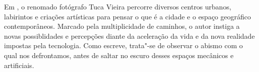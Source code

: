 \hspace*{-7cm}\hrulefill\hspace*{-7cm}



\medskip

\noindent{}Em {}, o renomado fotógrafo Tuca Vieira percorre diversos centros urbanos, labirintos e criações artísticas para pensar o que é a cidade e o espaço geográfico contemporâneos. Marcado pela multiplicidade de caminhos, o autor instiga a novas possiblidades e percepções diante da aceleração da vida e da nova realidade impostas pela tecnologia. Como escreve, trata"-se de observar o abismo com o qual nos defrontamos, antes de saltar no escuro desses espaços mecânicos e artificiais.

\vfill

\hspace*{-.4cm}\begin{minipage}[c]{1\linewidth}
\small{
{}}
\end{minipage}

\pagebreak